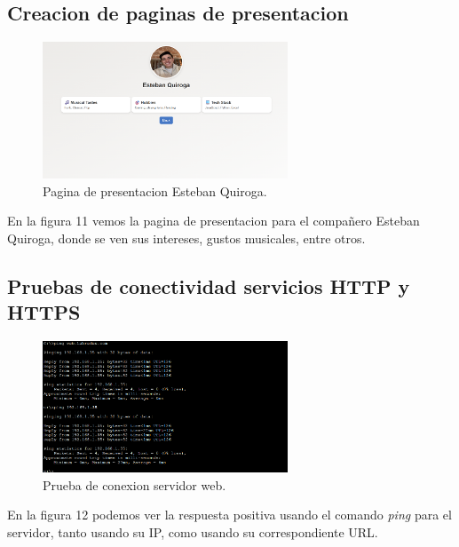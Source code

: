 \documentclass[10pt]{article}
\begin{document}
\subsection{Creacion de paginas de presentacion}
\begin{figure}[H]
    \centering
    \includegraphics[width=0.65\textwidth]{lab-01-screenshots/44-1-presentacion.png}
    \caption{Pagina de presentacion Esteban Quiroga.}
\end{figure}
En la figura 11 vemos la pagina de presentacion para el compañero Esteban Quiroga, donde se ven sus intereses, gustos musicales, entre otros.
\subsection{Pruebas de conectividad servicios HTTP y HTTPS}
\begin{figure}[H]
    \centering
    \includegraphics[width=0.65\textwidth]{lab-01-screenshots/44-2-prueba.png}
    \caption{Prueba de conexion servidor web.}
\end{figure}
En la figura 12 podemos ver la respuesta positiva usando el comando \textit{ping} para el servidor, tanto usando su IP, como usando su correspondiente URL.
\end{document}
